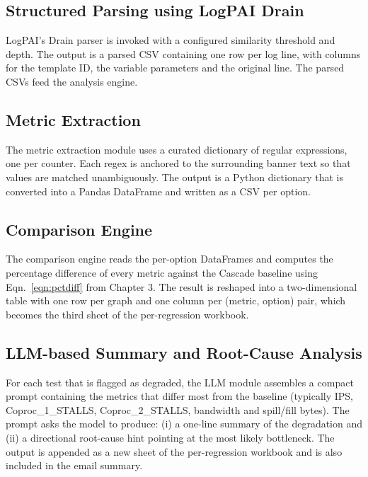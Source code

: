 \subsection{Structured Parsing using LogPAI Drain}
LogPAI's Drain parser is invoked with a configured similarity threshold and depth. The output is a parsed CSV containing one row per log line, with columns for the template ID, the variable parameters and the original line. The parsed CSVs feed the analysis engine.

\subsection{Metric Extraction}
The metric extraction module uses a curated dictionary of regular expressions, one per counter. Each regex is anchored to the surrounding banner text so that values are matched unambiguously. The output is a Python dictionary that is converted into a Pandas DataFrame and written as a CSV per option.

\subsection{Comparison Engine}
The comparison engine reads the per-option DataFrames and computes the percentage difference of every metric against the Cascade baseline using Eqn.\ \ref{eqn:pctdiff} from Chapter 3. The result is reshaped into a two-dimensional table with one row per graph and one column per (metric, option) pair, which becomes the third sheet of the per-regression workbook.

\subsection{LLM-based Summary and Root-Cause Analysis}
For each test that is flagged as degraded, the LLM module assembles a compact prompt containing the metrics that differ most from the baseline (typically IPS, Coproc\_1\_STALLS, Coproc\_2\_STALLS, bandwidth and spill/fill bytes). The prompt asks the model to produce: (i) a one-line summary of the degradation and (ii) a directional root-cause hint pointing at the most likely bottleneck. The output is appended as a new sheet of the per-regression workbook and is also included in the email summary.


